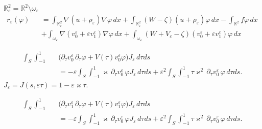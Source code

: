 \documentclass[graybox]{svmult}
\renewcommand{\kappa}{\varkappa}
\newcommand{\Real}{\mathbb R}
\newcommand{\eps}{\varepsilon}
\renewcommand{\phi}{\varphi}
\begin{document}
$\Real^2_\eps=\Real^2\setminus\omega_\eps$
\begin{eqnarray}\nonumber
r_\eps(\phi)&&=\int_{\Real^2_\eps}\nabla(u+\rho_\eps)\nabla \phi\,dx
            +\int_{\Real^2_\eps} (W-\zeta)(u+\rho_\eps) \phi\,dx
            -\int_{\Real^2}f\phi\,dx\\\nonumber
      &&+\int_{\omega_\eps}\nabla(v_0^\eps+\eps v_1^\eps)\nabla \phi\,dx
        +\int_{\omega_\eps}(W+V_\eps-\zeta)(v_0^\eps+\eps v_1^\eps) \phi\,dx
\end{eqnarray}

\begin{eqnarray}\nonumber
\int_S\int_{-1}^1&&\big(\partial_\tau v_0^\eps \,\partial_\tau \phi
+V(\tau)v_0^\eps \phi\big)J_\eps\,d\tau ds\\
&&=-\eps \int_S\int_{-1}^1 \kappa\,\partial_\tau v_0^\eps\, \phi J_\eps\,d\tau ds+\eps^2\int_S\int_{-1}^1 \tau\kappa^2\,\partial_\tau v_0^\eps \,\phi \,d\tau ds.
\end{eqnarray}
$J_\eps=J(s,\eps\tau)=1-\eps\kappa\tau$.

\begin{eqnarray}\nonumber
\int_S\int_{-1}^1&&\big(\partial_\tau v_1^\eps \,\partial_\tau \phi
+V(\tau)v_1^\eps \phi\big)J_\eps\,d\tau ds\\
&&=-\eps \int_S\int_{-1}^1 \kappa\,\partial_\tau v_0^\eps\, \phi J_\eps\,d\tau ds+\eps^2\int_S\int_{-1}^1 \tau\kappa^2\,\partial_\tau v_0^\eps \,\phi \,d\tau ds.
\end{eqnarray}































\newpage

\end{document}
